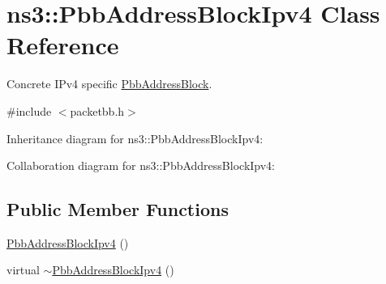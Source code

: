 \hypertarget{classns3_1_1PbbAddressBlockIpv4}{}\section{ns3\+:\+:Pbb\+Address\+Block\+Ipv4 Class Reference}
\label{classns3_1_1PbbAddressBlockIpv4}


Concrete I\+Pv4 specific \hyperlink{classns3_1_1PbbAddressBlock}{Pbb\+Address\+Block}.  




{\ttfamily \#include $<$packetbb.\+h$>$}



Inheritance diagram for ns3\+:\+:Pbb\+Address\+Block\+Ipv4\+:


Collaboration diagram for ns3\+:\+:Pbb\+Address\+Block\+Ipv4\+:
\subsection*{Public Member Functions}
\begin{DoxyCompactItemize}
\item 
\hyperlink{classns3_1_1PbbAddressBlockIpv4_a82298ebe70099549f59ea95e00374a26}{Pbb\+Address\+Block\+Ipv4} ()
\item 
virtual \hyperlink{classns3_1_1PbbAddressBlockIpv4_adcb36be6e2eb60d0e49492ffe65787cd}{$\sim$\+Pbb\+Address\+Block\+Ipv4} ()
\end{DoxyCompactItemize}
